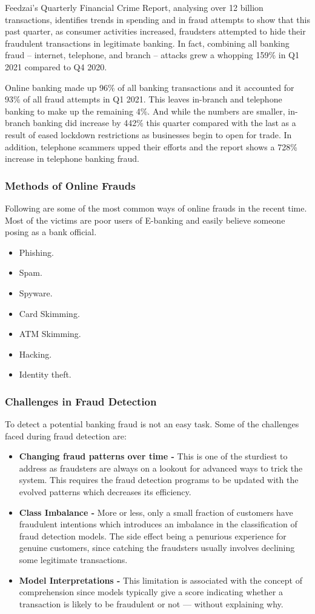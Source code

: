 \documentclass[12pt, oneside, a4paper]{article}
\begin{document}
Feedzai's Quarterly Financial Crime Report, analysing over 12 billion transactions, identifies trends in spending and in fraud attempts to show that this past quarter, as consumer activities increased, fraudsters attempted to hide their fraudulent transactions in legitimate banking. In fact, combining all banking fraud  – internet, telephone, and branch – attacks grew a whopping 159\% in Q1 2021 compared to Q4 2020. 

Online banking made up 96\% of all banking transactions and it accounted for 93\% of all fraud attempts in Q1 2021. This leaves in-branch and telephone banking to make up the remaining 4\%. And while the numbers are smaller, in-branch banking did increase by 442\% this quarter compared with the last as a result of eased lockdown restrictions as businesses begin to open for trade. In addition, telephone scammers upped their efforts and the report shows a 728\% increase in telephone banking fraud.

\subsubsection{Methods of Online Frauds}
Following are some of the most common ways of online frauds in the recent time. Most of the victims are poor users of E-banking and easily believe someone posing as a bank official.
\begin{itemize}
    \item Phishing.
    \item Spam.
    \item Spyware.
    \item Card Skimming.
    \item ATM Skimming.
    \item Hacking.
    \item Identity theft.
\end{itemize}

\subsubsection{Challenges in Fraud Detection}
To detect a potential banking fraud is not an easy task. Some of the challenges faced during fraud detection are:
\begin{itemize}
    \item \textbf{Changing fraud patterns over time - }This is one of the sturdiest to address as fraudsters are always on a lookout for advanced ways to trick the system. This requires the fraud detection programs to be updated with the evolved patterns which decreases its efficiency.
    \item \textbf{Class Imbalance - }More or less, only a small fraction of customers have fraudulent intentions which introduces an imbalance in the classification of fraud detection models. The side effect being a penurious experience for genuine customers, since catching the fraudsters usually involves declining some legitimate transactions.
    \item \textbf{Model Interpretations - }This limitation is associated with the concept of comprehension since models typically give a score indicating whether a transaction is likely to be fraudulent or not — without explaining why.
\end{itemize}
\pagebreak
\end{document}
